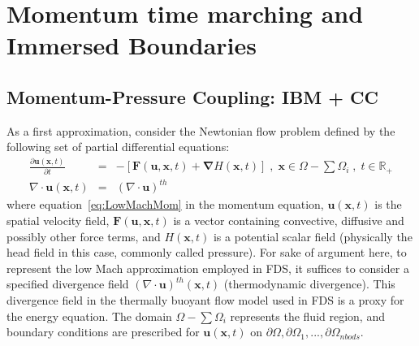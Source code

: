 \section{Momentum time marching and Immersed Boundaries}

\subsection{Momentum-Pressure Coupling: IBM + CC}

As a first approximation, consider the Newtonian flow problem defined by the following set of partial differential equations:
%
\begin{eqnarray}
  \frac{\partial \mathbf{u}(\mathbf{x},t)}{\partial t} &=& - \left[ \mathbf{F}(\mathbf{u},\mathbf{x},t) + \boldsymbol{\nabla} H(\mathbf{x},t) \right] \; , \; \mathbf{x} \in \Omega - \sum{\Omega_i} \; , \; t \in \mathbb{R}_+ \label{eq:LowMachMom} \\
         \nabla \cdot \mathbf{u} (\mathbf{x},t) & = & \left(\nabla \cdot \mathbf{u} \right)^{th} \label{eq:LowMachDiv}
\end{eqnarray}
%
where equation~\eqref{eq:LowMachMom} in the momentum equation, $\mathbf{u}(\mathbf{x},t)$ is the spatial velocity field, $\mathbf{F}(\mathbf{u},\mathbf{x},t)$ is a vector containing convective, diffusive and possibly other force terms, and $H(\mathbf{x},t)$ is a potential scalar field (physically the head field in this case, commonly called pressure). For sake of argument here, to represent the low Mach approximation employed in FDS, it suffices to consider a specified divergence field $\left(\nabla \cdot \mathbf{u} \right)^{th} (\mathbf{x},t)$ (thermodynamic divergence). This divergence field in the thermally buoyant flow model used in FDS is a proxy for the energy equation.
The domain $\Omega - \sum{\Omega_i}$ represents the fluid region, and boundary conditions are prescribed for $\mathbf{u}(\mathbf{x},t)$ on $\partial \Omega,\partial \Omega_1,...,\partial \Omega_{nbods}$.

